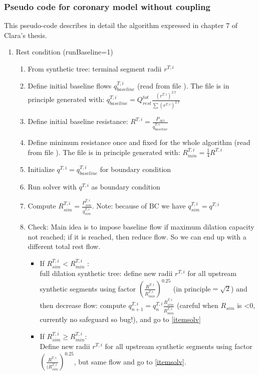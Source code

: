 \documentclass[a4paper, 11pt]{article} %
\begin{document}
\subsubsection{Pseudo code for coronary model without coupling}
This pseudo-code describes in detail the algorithm expressed in chapter 7 of Clara's thesis.

\begin{enumerate}[label=(\Alph*)]
\item Rest condition (runBaseline=1) \label{itemRest}
\begin{enumerate}[label={\arabic*.}]
\item From synthetic tree: terminal segment radii $r^{T,i}$ \label{itemRestStart}
\item Define initial baseline flows $q^{T,i}_{baseline}$ (read from file ). The file is in principle generated with: $q^{T,i}_{baseline}=Q^{tot}_{rest} \frac{(r^{T,i})^{2.7}}{\sum(r^{T,i})^{2.7}}$
\item Define initial baseline resistance: $R^{T,i} = \frac{P_{AO}}{q^{T,i}_{baseline}}$
\item Define minimum resistance once and fixed for the whole algorithm  (read from file ). The file is in principle generated with: $R^{T,i}_{min} = \frac{1}{4} R^{T,i}$
\item Initialize $q^{T,i} = q^{T,i}_{baseline}$ for boundary condition
\item Run solver with $q^{T,i}$ as boundary condition \label{itemsolv}
\item Compute $R^{T,i}_{sim} = \frac{P^{T,i}_{sim}}{q^{T,i}_{sim}}$. Note: because of BC we have $q^{T,i}_{sim} = q^{T,i}$
\item Check: Main idea is to impose baseline flow if maximum dilation capacity not reached; if it is reached, then reduce flow. So we can end up with a different total rest flow. 

\begin{itemize}
\item If $R^{T,i}_{sim} < R^{T,i}_{min}$ :  \\
full dilation synthetic tree: define new radii $r^{T,i}$ for all upstream synthetic segments using factor $\left(\frac{R^{T,i}}{R_{min}^{T,i}}\right)^{0.25}$ (in principle$ = \sqrt{2}$) and then decrease flow: compute $q_{n+1}^{T,i}=q_n^{T,i} \frac{R_{sim}^{T,i}}{R_{min}^{T,i}} $ (careful when $R_{sim}$ is <0, currently no safeguard so bug!), and go to \ref{itemsolv}
\item If $R^{T,i}_{sim} \geq R^{T,i}_{min}$:\\
Define new radii $r^{T,i}$ for all upstream synthetic segments using factor $\left(\frac{R^{T,i}}{(R_{sim}^{T,i}}\right)^{0.25}$, but same flow and go to \ref{itemsolv}.
\end{itemize}


\end{enumerate}
\end{enumerate}
\end{document}
